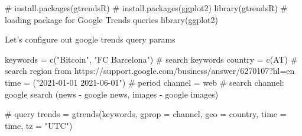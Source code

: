 \documentclass[
  letterpaper,
  DIV=11,
  numbers=noendperiod]{scrreprt}
\newenvironment{Shaded}{\begin{snugshade}}{\end{snugshade}}
\newcommand{\AttributeTok}[1]{\textcolor[rgb]{0.40,0.45,0.13}{#1}}
\newcommand{\CommentTok}[1]{\textcolor[rgb]{0.37,0.37,0.37}{#1}}
\newcommand{\FunctionTok}[1]{\textcolor[rgb]{0.28,0.35,0.67}{#1}}
\newcommand{\NormalTok}[1]{\textcolor[rgb]{0.00,0.23,0.31}{#1}}
\newcommand{\OtherTok}[1]{\textcolor[rgb]{0.00,0.23,0.31}{#1}}
\newcommand{\SpecialCharTok}[1]{\textcolor[rgb]{0.37,0.37,0.37}{#1}}
\newcommand{\StringTok}[1]{\textcolor[rgb]{0.13,0.47,0.30}{#1}}
\begin{document}
\begin{Shaded}
\begin{Highlighting}[]
\CommentTok{\# install.packages(\textquotesingle{}gtrendsR\textquotesingle{})}
\CommentTok{\# install.packages(\textquotesingle{}ggplot2\textquotesingle{})}
\FunctionTok{library}\NormalTok{(gtrendsR) }\CommentTok{\# loading package for Google Trends queries}
\FunctionTok{library}\NormalTok{(ggplot2)}
\end{Highlighting}
\end{Shaded}

Let's configure out google trends query params

\begin{Shaded}
\begin{Highlighting}[]
\NormalTok{keywords }\OtherTok{=} \FunctionTok{c}\NormalTok{(}\StringTok{"Bitcoin"}\NormalTok{, }\StringTok{"FC Barcelona"}\NormalTok{) }\CommentTok{\# search keywords}
\NormalTok{country }\OtherTok{=} \FunctionTok{c}\NormalTok{(}\StringTok{\textquotesingle{}AT\textquotesingle{}}\NormalTok{) }\CommentTok{\# search region from https://support.google.com/business/answer/6270107?hl=en}
\NormalTok{time }\OtherTok{=}\NormalTok{ (}\StringTok{"2021{-}01{-}01 2021{-}06{-}01"}\NormalTok{) }\CommentTok{\# period}
\NormalTok{channel }\OtherTok{=} \StringTok{\textquotesingle{}web\textquotesingle{}} \CommentTok{\# search channel: google search (\textquotesingle{}news\textquotesingle{} {-} google news, \textquotesingle{}images\textquotesingle{} {-} google images)}
\end{Highlighting}
\end{Shaded}

\begin{Shaded}
\begin{Highlighting}[]
\CommentTok{\# query}
\NormalTok{trends }\OtherTok{=} \FunctionTok{gtrends}\NormalTok{(keywords, }\AttributeTok{gprop =}\NormalTok{ channel, }\AttributeTok{geo =}\NormalTok{ country, }\AttributeTok{time =}\NormalTok{ time, }\AttributeTok{tz =} \StringTok{"UTC"}\NormalTok{)}
\end{Highlighting}
\end{Shaded}

\begin{Shaded}
\end{Shaded}
\end{document}
